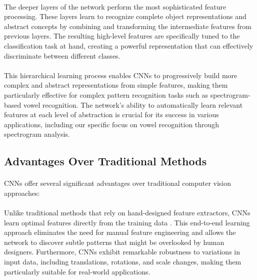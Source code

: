 \paragraph{}
The deeper layers of the network perform the most sophisticated feature processing. These layers learn to recognize complete object representations and abstract concepts by combining and transforming the intermediate features from previous layers. The resulting high-level features are specifically tuned to the classification task at hand, creating a powerful representation that can effectively discriminate between different classes.

\paragraph{}
This hierarchical learning process enables CNNs to progressively build more complex and abstract representations from simple features, making them particularly effective for complex pattern recognition tasks such as spectrogram-based vowel recognition. The network's ability to automatically learn relevant features at each level of abstraction is crucial for its success in various applications, including our specific focus on vowel recognition through spectrogram analysis.

\subsection{Advantages Over Traditional Methods}
\paragraph{}
CNNs offer several significant advantages over traditional computer vision approaches:

\paragraph{}
Unlike traditional methods that rely on hand-designed feature extractors, CNNs learn optimal features directly from the training data \cite{bengio2013representation}. This end-to-end learning approach eliminates the need for manual feature engineering and allows the network to discover subtle patterns that might be overlooked by human designers. Furthermore, CNNs exhibit remarkable robustness to variations in input data, including translations, rotations, and scale changes, making them particularly suitable for real-world applications.

